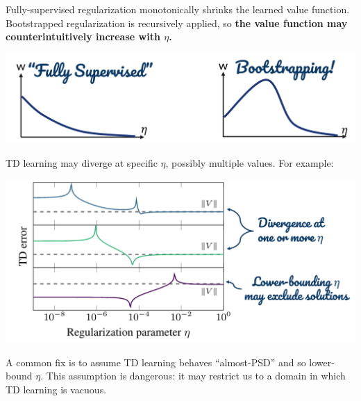 Fully-supervised regularization monotonically shrinks the learned value function. Bootstrapped regularization is recursively applied, so \textbf{the value function may counterintuitively increase with $\eta$.}
\vspace{-.17in}
\begin{center}
    \includegraphics[scale=0.4]{parts/nonmonotonic/illus.png}
\end{center}
\vspace{-.07in}
TD learning may diverge at specific $\eta$, possibly multiple values. For example:
\vspace{-.07in}
\begin{center}
    \hspace*{1in}
    \includegraphics[scale=0.4]{parts/nonmonotonic/threeex.png}
\end{center}
\vspace{-.07in}
A common fix is to assume TD learning behaves ``almost-PSD'' and so lower-bound $\eta$. This assumption is dangerous: it may restrict us to a domain in which TD learning is vacuous.
